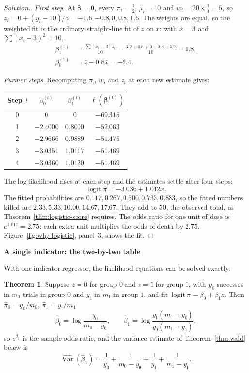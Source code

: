 \documentclass[11pt,a4paper]{article}
\numberwithin{equation}{section}
\theoremstyle{definition}
\newtheorem{thm}{Theorem}[subsection]
\newenvironment{solution}
  {\renewcommand{\qedsymbol}{}\begin{proof}[\textit{Solution}.]}
  {\end{proof}}
\newcommand{\subhead}[1]{%
  \par\medskip\noindent\textbf{#1}\par\nobreak\smallskip}
\begin{document}
\begin{solution}
\emph{First step.} At $\boldsymbol\beta = \mathbf{0}$, every $\pi_i = \frac12$, $\mu_i = 10$ and $w_i = 20 \times \frac14 = 5$, so
$z_i = 0 + (y_i - 10)/5 = -1.6, -0.8, 0, 0.8, 1.6$. The weights are equal, so the weighted fit is the ordinary straight-line fit
of $z$ on $x$: with $\bar x = 3$ and $\sum(x_i - 3)^2 = 10$,
\begin{align*}
\beta_1^{(1)} &= \frac{\sum(x_i - 3)z_i}{10} = \frac{3.2 + 0.8 + 0 + 0.8 + 3.2}{10} = 0.8 , \\
\beta_0^{(1)} &= \bar z - 0.8\bar x = -2.4 .
\end{align*}

\emph{Further steps.} Recomputing $\pi_i$, $w_i$ and $z_i$ at each new estimate gives:
\begin{center}
\begin{tabular}{cccc}
Step $t$ & $\beta_0^{(t)}$ & $\beta_1^{(t)}$ & $\ell(\boldsymbol\beta^{(t)})$ \\
\hline
0 & 0 & 0 & $-69.315$ \\
1 & $-2.4000$ & $0.8000$ & $-52.063$ \\
2 & $-2.9666$ & $0.9889$ & $-51.475$ \\
3 & $-3.0351$ & $1.0117$ & $-51.469$ \\
4 & $-3.0360$ & $1.0120$ & $-51.469$ \\
\end{tabular}
\end{center}
The log-likelihood rises at each step and the estimates settle after four steps:
\[
\operatorname{logit}\hat\pi = -3.036 + 1.012x .
\]
The fitted probabilities are $0.117, 0.267, 0.500, 0.733, 0.883$, so the fitted numbers killed are
$2.33, 5.33, 10.00, 14.67, 17.67$. They add to $50$, the observed total, as Theorem~\ref{thm:logistic-score} requires. The
odds ratio for one unit of dose is $e^{1.012} = 2.75$: each extra unit multiplies the odds of death by $2.75$.
Figure~\ref{fig:why-logistic}, panel~3, shows the fit.
\end{solution}

\subhead{A single indicator: the two-by-two table}
With one indicator regressor, the likelihood equations can be solved exactly.

\begin{thm}\label{thm:logit-indicator}
Suppose $z = 0$ for group $0$ and $z = 1$ for group $1$, with $y_0$ successes in $m_0$ trials in group $0$ and $y_1$ in $m_1$
in group $1$, and fit $\operatorname{logit}\pi = \beta_0 + \beta_1z$. Then $\hat\pi_0 = y_0/m_0$, $\hat\pi_1 = y_1/m_1$,
\[
\hat\beta_0 = \log\frac{y_0}{m_0 - y_0}, \qquad \hat\beta_1 = \log\frac{y_1(m_0 - y_0)}{y_0(m_1 - y_1)} ,
\]
so $e^{\hat\beta_1}$ is the sample odds ratio, and the variance estimate of Theorem~\ref{thm:wald} below is
\[
\widehat{\operatorname{Var}}(\hat\beta_1) = \frac{1}{y_0} + \frac{1}{m_0 - y_0} + \frac{1}{y_1} + \frac{1}{m_1 - y_1} .
\]
\end{thm}
\end{document}
